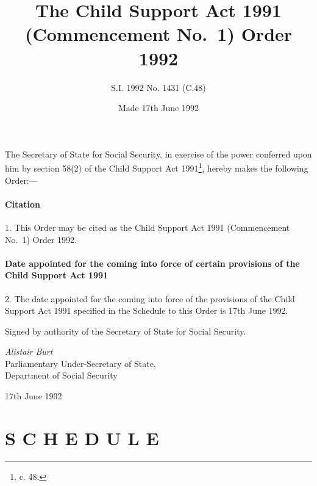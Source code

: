 \documentclass[a4paper]{article}
\title{The Child Support Act 1991 (Commencement No.\ 1) Order 1992}
\author{S.I. 1992 No. 1431 (C.48)}
\date{Made 17th June 1992}
\begin{document}
\maketitle

\noindent
The Secretary of State for Social Security, in exercise of the power conferred upon him by section 58(2) of the Child Support Act 1991\footnote{ c. 48.}, hereby makes the following Order:—

{\sloppy

\tableofcontents

}

\setcounter{secnumdepth}{-2}

\subsection[1. Citation]{Citation}

1.  This Order may be cited as the Child Support Act 1991 (Commencement No.\ 1) Order 1992.

\subsection[2. Date appointed for the coming into force of certain provisions of the Child Support Act 1991]{Date appointed for the coming into force of certain provisions of the Child Support Act 1991}

2.  The date appointed for the coming into force of the provisions of the Child Support Act 1991 specified in the Schedule to this Order is 17th June 1992.

\bigskip

Signed by authority of the Secretary of State for Social Security.

{\raggedleft
\emph{Alistair Burt}\\Parliamentary Under-Secretary of State,\\Department of Social Security

}

17th June 1992

\clearpage

\part[Schedule]{S C H E D U L E}
\end{document}
